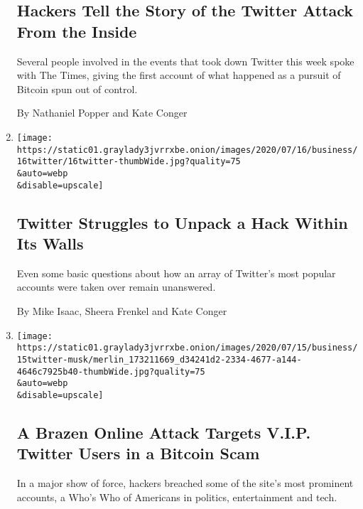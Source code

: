 \begin{enumerate}
  \hypertarget{hackers-tell-the-story-of-the-twitter-attack-from-the-inside}{%
  \subsection{Hackers Tell the Story of the Twitter Attack From the
  Inside}\label{hackers-tell-the-story-of-the-twitter-attack-from-the-inside}}

  Several people involved in the events that took down Twitter this week
  spoke with The Times, giving the first account of what happened as a
  pursuit of Bitcoin spun out of control.

  By Nathaniel Popper and Kate Conger
\item
  \href{/2020/07/16/technology/twitter-hack-investigation.html}{}

  \texttt{[image: https://static01.graylady3jvrrxbe.onion/images/2020/07/16/business/16twitter/16twitter-thumbWide.jpg?quality=75\\\&auto=webp\\\&disable=upscale]}

  \hypertarget{twitter-struggles-to-unpack-a-hack-within-its-walls}{%
  \subsection{Twitter Struggles to Unpack a Hack Within Its
  Walls}\label{twitter-struggles-to-unpack-a-hack-within-its-walls}}

  Even some basic questions about how an array of Twitter's most popular
  accounts were taken over remain unanswered.

  By Mike Isaac, Sheera Frenkel and Kate Conger
\item
  \href{/2020/07/15/technology/twitter-hack-bill-gates-elon-musk.html}{}

  \texttt{[image: https://static01.graylady3jvrrxbe.onion/images/2020/07/15/business/15twitter-musk/merlin\_173211669\_d34241d2-2334-4677-a144-4646c7925b40-thumbWide.jpg?quality=75\\\&auto=webp\\\&disable=upscale]}

  \hypertarget{a-brazen-online-attack-targets-vip-twitter-users-in-a-bitcoin-scam}{%
  \subsection{A Brazen Online Attack Targets V.I.P. Twitter Users in a
  Bitcoin
  Scam}\label{a-brazen-online-attack-targets-vip-twitter-users-in-a-bitcoin-scam}}

  In a major show of force, hackers breached some of the site's most
  prominent accounts, a Who's Who of Americans in politics,
  entertainment and tech.


\end{enumerate}
